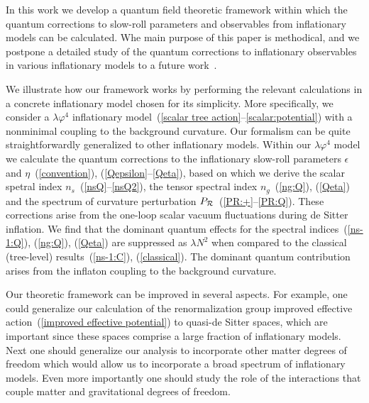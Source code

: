 \documentclass[aps,12pt,superscriptaddress,preprintnumbers,
                secnumarabic,nofootinbib,showpacs]{revtex4}
\begin{document}
In this work we develop a quantum field theoretic framework within which
the quantum corrections to slow-roll parameters and
observables from inflationary models can be calculated.
Whe main purpose of this paper is methodical, and we postpone a detailed study
of the quantum corrections to inflationary observables in various
inflationary models to a future work~\cite{ProkopecBilandzic}.

 We illustrate how our framework works by performing the relevant calculations
in a concrete inflationary model chosen for its simplicity.
More specifically, we consider a $\lambda\varphi^4$ inflationary
model~(\ref{scalar tree action}--\ref{scalar:potential})
with a nonminimal coupling to the background curvature.
Our formalism can be quite straightforwardly generalized to other
inflationary models. Within our
$\lambda\varphi^4$ model we calculate the quantum corrections to
the inflationary slow-roll parameters $\epsilon$ and
$\eta$~(\ref{convention}), (\ref{Qepsilon}--\ref{Qeta}),
based on which we derive the scalar spetral index
$n_s$~(\ref{nsQ}--\ref{nsQ2}),
the tensor spectral index $n_g$~(\ref{ng:Q}), (\ref{Qeta})
and the spectrum of curvature perturbation
${P}_{\cal R}$~(\ref{PR:+}--\ref{PR:Q}).
These corrections arise from the one-loop scalar vacuum fluctuations
during de Sitter inflation.
We find that the dominant quantum effects
for the spectral indices~(\ref{ns-1:Q}), (\ref{ng:Q}), (\ref{Qeta})
are suppressed as $\lambda N^2$
when compared to the classical (tree-level) results~(\ref{ns-1:C}),
(\ref{classical}). The dominant quantum contribution
arises from the inflaton coupling to the background curvature.

 Our theoretic framework can be improved in several aspects.
For example, one could generalize our calculation of the renormalization
group improved effective action~(\ref{improved effective potential})
to quasi-de Sitter spaces, which are important since these spaces
comprise a large fraction of inflationary models.
Next one should generalize our analysis to incorporate
other matter degrees of freedom which would allow us to
incorporate a broad spectrum of inflationary models.
Even more importantly one should study the role
of the interactions that couple matter and gravitational degrees of freedom.
\end{document}

